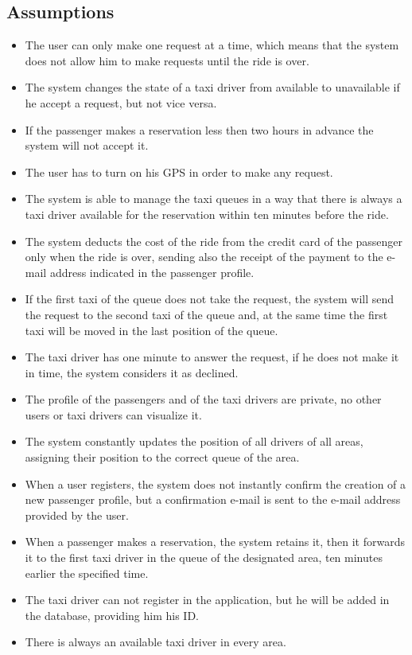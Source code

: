 \documentclass[18pt,oneside,a4paper, titlepage]{article}
\begin{document}
		\subsection{Assumptions}
			\begin{itemize}
				\item The user can only make one request at a time, which means that the system does not allow him to make requests until the ride is over.
				\item The system changes the state of a taxi driver from available to unavailable if he accept a request, but not vice versa.
				\item If the passenger makes a reservation less then two hours in advance the system will not accept it.
				\item The user has to turn on his GPS in order to make any request.
				\item The system is able to manage the taxi queues in a way that there is always a taxi driver available for the reservation within ten minutes before the ride.
				\item The system deducts the cost of the ride from the credit card of the passenger only when the ride is over, sending also the receipt of the payment to the e-mail address indicated in the passenger profile.
				\item If the first taxi of the queue does not take the request, the system will send the request to the second taxi of the queue and, at the same time the first taxi will be moved in the last position of the queue.
				\item The taxi driver has one minute to answer the request, if he does not make it in time, the system considers it as declined.
				\item The profile of the passengers and of the taxi drivers are private, no other users or taxi drivers can visualize it.
				\item  The system constantly updates the position of all drivers of all areas, assigning their position to the correct queue of the area.
				\item When a user registers, the system does not instantly confirm the creation of a new passenger profile, but a confirmation e-mail is sent to the e-mail address provided by the user.
				\item When a passenger makes a reservation, the system retains it, then it forwards it to the first taxi driver in the queue of the designated area, ten minutes earlier the specified time.
				\item The taxi driver can not register in the application, but he will be added in the database, providing him his ID.
				\item There is always an available taxi driver in every area.
			\end{itemize}
			
\end{document}
